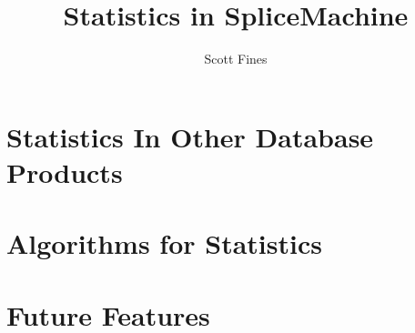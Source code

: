 \documentclass[10pt]{amsart}
\begin{document}
\title{Statistics in SpliceMachine}
\author{Scott Fines}

\maketitle

\tableofcontents

\clearpage
\begin{subappendices}
	\label{sec:Appendix}
	\section*{Statistics In Other Database Products}
	\label{sec:OtherDBs}
	
	\clearpage
	\section*{Algorithms for Statistics}
	\label{sec:Algorithms}
	
	\section*{Future Features}
	\label{sec:Future}
	
\end{subappendices}

\clearpage
\printbibliography
\end{document}
